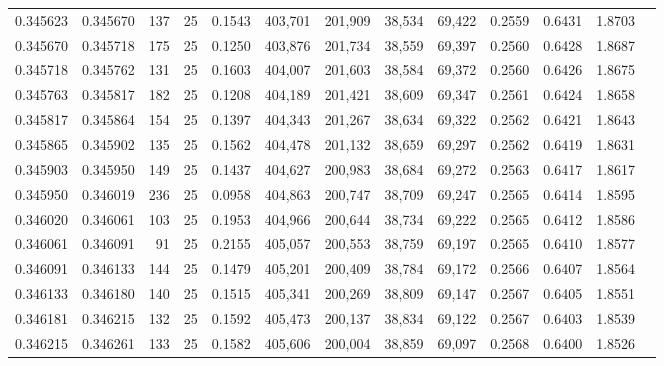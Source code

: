 \begin{tabular}{rrrrrrrrrrrrr}
0.345623 & 0.345670 &   137 &  25 &                                     0.1543 & 403,701 & 201,909 &  38,534 &  69,422 & 0.2559 & 0.6431 & 1.8703 \\
0.345670 & 0.345718 &   175 &  25 &                                     0.1250 & 403,876 & 201,734 &  38,559 &  69,397 & 0.2560 & 0.6428 & 1.8687 \\
0.345718 & 0.345762 &   131 &  25 &                                     0.1603 & 404,007 & 201,603 &  38,584 &  69,372 & 0.2560 & 0.6426 & 1.8675 \\
0.345763 & 0.345817 &   182 &  25 &                                     0.1208 & 404,189 & 201,421 &  38,609 &  69,347 & 0.2561 & 0.6424 & 1.8658 \\
0.345817 & 0.345864 &   154 &  25 &                                     0.1397 & 404,343 & 201,267 &  38,634 &  69,322 & 0.2562 & 0.6421 & 1.8643 \\
0.345865 & 0.345902 &   135 &  25 &                                     0.1562 & 404,478 & 201,132 &  38,659 &  69,297 & 0.2562 & 0.6419 & 1.8631 \\
0.345903 & 0.345950 &   149 &  25 &                                     0.1437 & 404,627 & 200,983 &  38,684 &  69,272 & 0.2563 & 0.6417 & 1.8617 \\
0.345950 & 0.346019 &   236 &  25 &                                     0.0958 & 404,863 & 200,747 &  38,709 &  69,247 & 0.2565 & 0.6414 & 1.8595 \\
0.346020 & 0.346061 &   103 &  25 &                                     0.1953 & 404,966 & 200,644 &  38,734 &  69,222 & 0.2565 & 0.6412 & 1.8586 \\
0.346061 & 0.346091 &    91 &  25 &                                     0.2155 & 405,057 & 200,553 &  38,759 &  69,197 & 0.2565 & 0.6410 & 1.8577 \\
0.346091 & 0.346133 &   144 &  25 &                                     0.1479 & 405,201 & 200,409 &  38,784 &  69,172 & 0.2566 & 0.6407 & 1.8564 \\
0.346133 & 0.346180 &   140 &  25 &                                     0.1515 & 405,341 & 200,269 &  38,809 &  69,147 & 0.2567 & 0.6405 & 1.8551 \\
0.346181 & 0.346215 &   132 &  25 &                                     0.1592 & 405,473 & 200,137 &  38,834 &  69,122 & 0.2567 & 0.6403 & 1.8539 \\
0.346215 & 0.346261 &   133 &  25 &                                     0.1582 & 405,606 & 200,004 &  38,859 &  69,097 & 0.2568 & 0.6400 & 1.8526 \\

\end{tabular}
